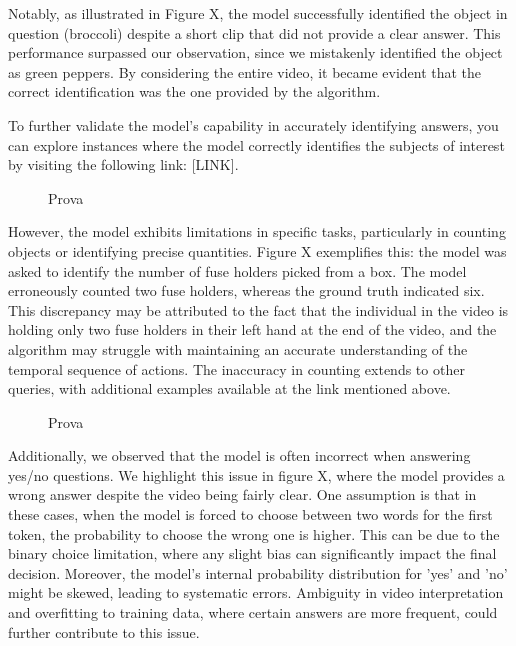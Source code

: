 \documentclass[conference]{IEEEtran}
\begin{document}
Notably, as illustrated in Figure X, the model successfully identified the object in question (broccoli) despite a short clip that did not provide a clear answer. This performance surpassed our observation, since we mistakenly identified the object as green peppers. By considering the entire video, it became evident that the correct identification was the one provided by the algorithm.

To further validate the model’s capability in accurately identifying answers, you can explore instances where the model correctly identifies the subjects of interest by visiting the following link: [LINK].

\begin{figure}[ht]
  \centering
  \caption{Prova}
  \label{fig:animation}
\end{figure}

However, the model exhibits limitations in specific tasks, particularly in counting objects or identifying precise quantities. Figure X exemplifies this: the model was asked to identify the number of fuse holders picked from a box. The model erroneously counted two fuse holders, whereas the ground truth indicated six. This discrepancy may be attributed to the fact that the individual in the video is holding only two fuse holders in their left hand at the end of the video, and the algorithm may struggle with maintaining an accurate understanding of the temporal sequence of actions.
The inaccuracy in counting extends to other queries, with additional examples available at the link mentioned above.

\begin{figure}[ht]
  \centering
  \caption{Prova}
  \label{fig:animation}
\end{figure}

Additionally, we observed that the model is often incorrect when answering yes/no questions. We highlight this issue in figure X, where the model provides a wrong answer despite the video being fairly clear. One assumption is that in these cases, when the model is forced to choose between two words for the first token, the probability to choose the wrong one is higher. This can be due to the binary choice limitation, where any slight bias can significantly impact the final decision. Moreover, the model's internal probability distribution for 'yes' and 'no' might be skewed, leading to systematic errors. Ambiguity in video interpretation and overfitting to training data, where certain answers are more frequent, could further contribute to this issue.
\end{document}
